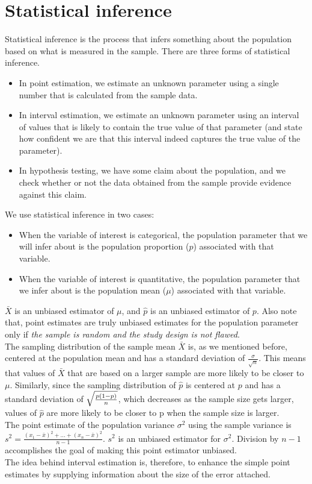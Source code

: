 \documentclass[10pt, a4paper]{article}
\begin{document}
\section{Statistical inference}
Statistical inference is the process that infers something about the population based on what is measured in the sample.
There are three forms of statistical inference.
\begin{itemize}
  \item In point estimation, we estimate an unknown parameter using a single number that is calculated from the sample data.
  \item In interval estimation, we estimate an unknown parameter using an interval of values that is likely to contain the true value of that parameter (and state how confident we are that this interval indeed captures the true value of the parameter).
  \item In hypothesis testing, we have some claim about the population, and we check whether or not the data obtained from the sample provide evidence against this claim.
  \end{itemize}
  We use statistical inference in two cases:
  \begin{itemize}
    \item When the variable of interest is categorical, the population parameter that we will infer about is the population proportion ($p$) associated with that variable.
    \item When the variable of interest is quantitative, the population parameter that we infer about is the population mean ($\mu$) associated with that variable.  
    \end{itemize}
    $\bar{X}$ is an unbiased estimator of $\mu$, and $\hat{p}$ is an unbiased estimator of $p$. Also note that, point estimates are truly unbiased estimates for the population parameter only if \emph{the sample is random and the study design is not flawed}.\\
    The sampling distribution of the sample mean $\bar{X}$ is, as we mentioned before, centered at the population mean and has a standard deviation of $\frac{\sigma}{\sqrt{n}}$.  This means that values of $\bar{X}$ that are based on a larger sample are more likely to be closer to $\mu$. Similarly, since the sampling distribution of $\hat{p}$ is centered at $p$ and has a standard deviation of $\sqrt{p(1-p)\over n}$, which decreases as the sample size gets larger, values of $\hat{p}$ are more likely to be closer to p when the sample size is larger.\\ 
 The point estimate of the population variance $\sigma^2$ using the sample variance is $s^2=\frac{(x_1-\bar{x})^2+\dots+(x_n-\bar{x})^2}{n-1}$. $s^2$ is an unbiased estimator for $\sigma^2$. Division by $n-1$ accomplishes the goal of making this point estimator unbiased.\\
The idea behind interval estimation is, therefore, to enhance the simple point estimates by supplying information about the size of the error attached.
\end{document}
